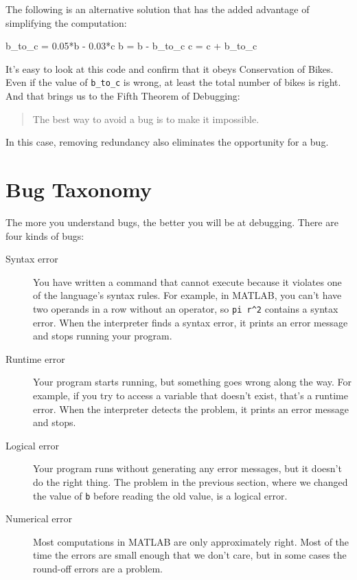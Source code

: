 
The following is an alternative solution that
has the added advantage of simplifying the computation:

\begin{code}
b_to_c = 0.05*b - 0.03*c
b = b - b_to_c
c = c + b_to_c
\end{code}

It's easy to look at this code and confirm that it obeys Conservation
of Bikes.  Even if the value of \lstinline{b_to_c} is wrong, at least the total
number of bikes is right.  And that brings us to the Fifth Theorem of
Debugging:

\begin{quote}
The best way to avoid a bug is to make it impossible.
\end{quote}

In this case, removing redundancy also eliminates the opportunity for  a bug.

\section{Bug Taxonomy}

The more you understand bugs, the better you will be at debugging.
There are four kinds of bugs:


\begin{description}

\item[Syntax error] You have written a command that cannot
execute because it violates one of the language's syntax rules.  For example, in MATLAB,
you can't have two operands in a row without an operator, so
\lstinline{pi r^2} contains a syntax error.  When the interpreter finds a syntax
error, it prints an error message and stops running your program.

\item[Runtime error] Your program starts running, but something goes
wrong along the way.  For example, if you try to access a variable
that doesn't exist, that's a runtime error.  When the interpreter detects the
problem, it prints an error message and stops.

\item[Logical error] Your program runs without generating any error
messages, but it doesn't do the right thing.  The problem in the
previous section, where we changed the value of \lstinline{b} before
reading the old value, is a logical error.

\item[Numerical error] Most computations in MATLAB are only
approximately right.  Most of the time the errors are small enough
that we don't care, but in some cases the round-off errors are a problem.

\end{description}

